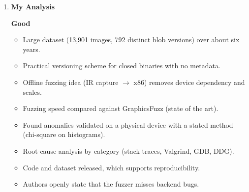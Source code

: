 \documentclass[11pt,a4paper]{article}
\newcommand{\entrypart}[1]{\textbf{\color{accent}#1}\par\vspace{2pt}}
\begin{document}
\begin{enumerate}
    \item \entrypart{My Analysis}

    \textbf{Good}
    \begin{itemize}[leftmargin=*, itemsep=1pt, topsep=2pt]
        \item Large dataset (13,901 images, 792 distinct blob versions) over about six years.
        \item Practical versioning scheme for closed binaries with no metadata.
        \item Offline fuzzing idea (IR capture $\rightarrow$ x86) removes device dependency and scales.
        \item Fuzzing speed compared against GraphicsFuzz (state of the art).
        \item Found anomalies validated on a physical device with a stated method (chi-square on histograms).
        \item Root-cause analysis by category (stack traces, Valgrind, GDB, DDG).
        \item Code and dataset released, which supports reproducibility.
        \item Authors openly state that the fuzzer misses backend bugs.
    \end{itemize}


\end{enumerate}
\end{document}
